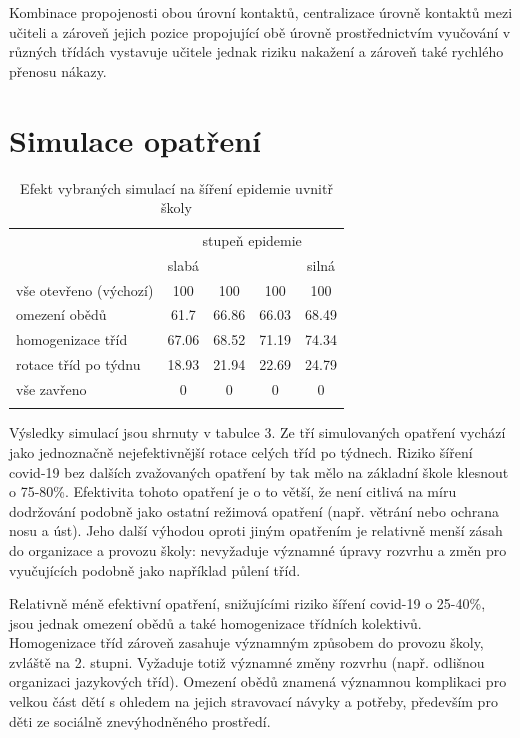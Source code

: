 Kombinace propojenosti obou úrovní kontaktů, centralizace úrovně kontaktů mezi učiteli a zároveň jejich pozice propojující obě úrovně prostřednictvím vyučování v různých třídách vystavuje učitele jednak riziku nakažení a zároveň také rychlého přenosu nákazy. 

    
\section*{Simulace opatření} 

\begin{table}[]
    \centering
    \caption{Efekt vybraných simulací na šíření epidemie uvnitř školy}
\begin{tabular}{lcccc}
\hline
                       & \multicolumn{4}{c}{stupeň epidemie} \\ 
                       & slabá   &         &        & silná  \\ \hline
vše otevřeno (výchozí) & 100     & 100     & 100    & 100    \\
omezení obědů          & 61.7    & 66.86   & 66.03  & 68.49  \\
homogenizace tříd      & 67.06   & 68.52   & 71.19  & 74.34  \\
rotace tříd po týdnu   & 18.93   & 21.94   & 22.69  & 24.79  \\
vše zavřeno            & 0       & 0       & 0      & 0      \\ \hline
\label{tab:100-sims}
\end{tabular}
\end{table}

Výsledky simulací jsou shrnuty v tabulce 3. Ze tří simulovaných opatření vychází jako jednoznačně nejefektivnější rotace celých tříd po týdnech. Riziko šíření covid-19 bez dalších zvažovaných opatření by tak mělo na základní škole klesnout o 75-80\%. Efektivita tohoto opatření je o to větší, že není citlivá na míru dodržování podobně jako ostatní režimová opatření (např. větrání nebo ochrana nosu a úst). Jeho další výhodou oproti jiným opatřením je relativně menší zásah do organizace a provozu školy: nevyžaduje významné úpravy rozvrhu a změn pro vyučujících podobně jako například půlení tříd.

Relativně méně efektivní opatření, snižujícími riziko šíření covid-19 o 25-40\%, jsou jednak omezení obědů a také homogenizace třídních kolektivů. Homogenizace tříd zároveň zasahuje významným způsobem do provozu školy, zvláště na 2. stupni. Vyžaduje totiž významné změny rozvrhu (např. odlišnou organizaci jazykových tříd). Omezení obědů znamená významnou komplikaci pro velkou část dětí s ohledem na jejich stravovací návyky a potřeby, především pro děti ze sociálně znevýhodněného prostředí.



